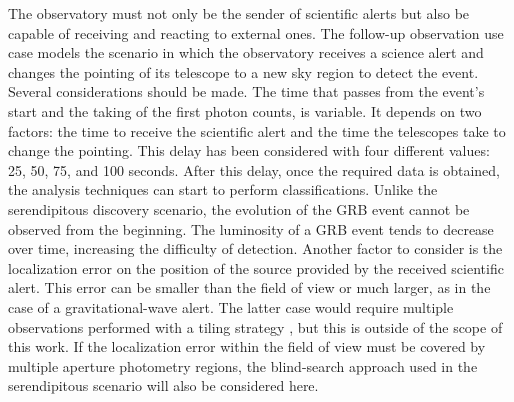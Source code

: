 The observatory must not only be the sender of scientific alerts but also be capable of receiving and reacting to external ones. The follow-up observation use case models the scenario in which the observatory receives a science alert and changes the pointing of its telescope to a new sky region to detect the event. Several considerations should be made. The time that passes from the event's start and the taking of the first photon counts, is variable. It depends on two factors: the time to receive the scientific alert and the time the telescopes take to change the pointing. This delay has been considered with four different values: 25, 50, 75, and 100 seconds. After this delay, once the required data is obtained, the analysis techniques can start to perform classifications. Unlike the serendipitous discovery scenario, the evolution of the GRB event cannot be observed from the beginning. The luminosity of a GRB event tends to decrease over time, increasing the difficulty of detection. Another factor to consider is the localization error on the position of the source provided by the received scientific alert. This error can be smaller than the field of view or much larger, as in the case of a gravitational-wave alert. The latter case would require multiple observations performed with a tiling strategy \cite{seglar2019gravitational}, but this is outside of the scope of this work. If the localization error within the field of view must be covered by multiple aperture photometry regions, the blind-search approach used in the serendipitous scenario will also be considered here.   

 
